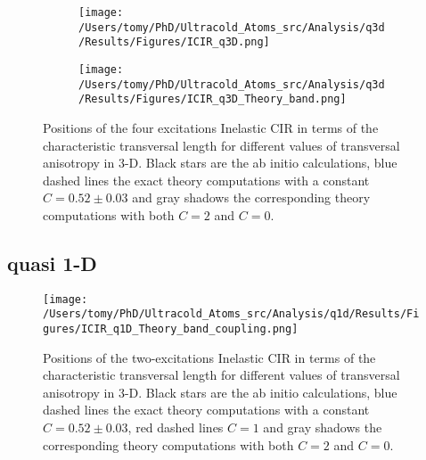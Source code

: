 \documentclass[aps,pre,twocolumn,superscriptaddress,showpacs]{revtex4-1}
\begin{document}
	\begin{figure}[H]
	 \begin{subfigure}{0.5\textwidth}
	  \centering
	 \texttt{[image: /Users/tomy/PhD/Ultracold\_Atoms\_src/Analysis/q3d/Results/Figures/ICIR\_q3D.png]}
	 \end{subfigure}
	 \vspace{10pt}
	 \begin{subfigure}{0.5\textwidth}
	   \centering
    	 \texttt{[image: /Users/tomy/PhD/Ultracold\_Atoms\_src/Analysis/q3d/Results/Figures/ICIR\_q3D\_Theory\_band.png]}
	 \end{subfigure}
    	\caption{Positions of the four excitations Inelastic CIR in terms of the characteristic transversal length for different values of transversal anisotropy in 3-D. Black stars are the ab initio calculations, blue dashed lines the exact theory computations with a constant $C=0.52\pm0.03$ and gray shadows the corresponding theory computations with both $C=2$ and $C=0$. }
    	\label{fig:q3d ICIR}
	\end{figure}
	

\subsection{quasi 1-D}
\begin{figure}[H]
   	 \centering
    	\texttt{[image: /Users/tomy/PhD/Ultracold\_Atoms\_src/Analysis/q1d/Results/Figures/ICIR\_q1D\_Theory\_band\_coupling.png]}
    	\caption{Positions of the two-excitations Inelastic CIR in terms of the characteristic transversal length for different values of transversal anisotropy in 3-D. Black stars are the ab initio calculations, blue dashed lines the exact theory computations with a constant $C=0.52\pm0.03$, red dashed lines $C=1$ and gray shadows the corresponding theory computations with both $C=2$ and $C=0$.}
    	\label{fig:q1D ICIR}
	\end{figure}
\end{document}
